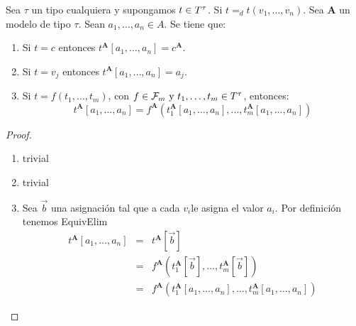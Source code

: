   \begin{lemma} \label{lemma_59}
    \PN Sea $\tau$ un tipo cualquiera y supongamos $t \in T^{\tau}$. Si $t =_{d} t(v_{1}, \dotsc, v_{n})$. Sea $\mathbf{A}$
    un modelo de tipo $\tau$. Sean $a_{1}, \dotsc, a_{n} \in A$. Se tiene que:
    \begin{enumerate}
      \item Si $t = c$ entonces $t^{\mathbf{A}}[a_{1}, \dotsc, a_{n}]= c^{\mathbf{A}}$.
      \item Si $t = v_{j}$ entonces $t^{\mathbf{A}}[a_{1}, \dotsc, a_{n}]= a_{j}$.
      \item Si $t = f(t_{1}, \dotsc, t_{m})$, con $f \in \mathcal{F}_{m} \ \text{y} \ t_{1}, \dotsc, t_{m} \in T^{\tau}$, entonces:
      \[
        t^{\mathbf{A}}[a_{1}, \dotsc, a_{n}]= f^{\mathbf{A}}(t_{1}^{\mathbf{A}}[a_{1}, \dotsc, a_{n}], \dotsc,
        t_{m}^{\mathbf{A}}[a_{1}, \dotsc, a_{n}])
      \]
    \end{enumerate}
  \end{lemma}
  \begin{proof}
    \begin{enumerate}[(1)]
      \item trivial
      \item trivial
      \item Sea $\vec{b}$ una asignación tal que a cada $v_{i}$le asigna el valor $a_{i}$. Por definición tenemos EquivElim
      \begin{eqnarray*}
        t^{\mathbf{A}}[a_{1}, \dotsc, a_{n}] &=& t^{\mathbf{A}}[\vec{b}] \\
        &=& f^{\mathbf{A}}(t_{1}^{\mathbf{A}}[\vec{b}], \dotsc, t_{m}^{\mathbf{A}}[\vec{b}]) \\
        &=& f^{\mathbf{A}}(t_{1}^{\mathbf{A}}[a_{1}, \dotsc, a_{n}], \dotsc, t_{m}^{\mathbf{A}}[a_{1}, \dotsc, a_{n}])
      \end{eqnarray*}
    \end{enumerate}
  \end{proof}

